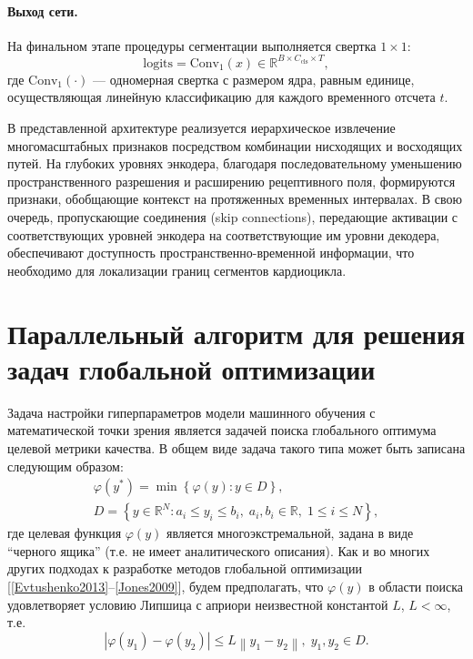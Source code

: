 \documentclass[10pt,a4paper]{book}
\begin{document}
\paragraph{Выход сети.}
На финальном этапе процедуры сегментации выполняется свертка $1\times1$:
\[
\text{logits} = \text{Conv}_{1}(x) \in \mathbb{R}^{B \times C_{\text{cls}} \times T},
\]
где $\text{Conv}_{1}(\cdot)$ --- одномерная свертка с размером ядра, равным единице, осуществляющая линейную классификацию для каждого временного отсчета $t$.

В представленной архитектуре реализуется иерархическое извлечение многомасштабных признаков посредством комбинации нисходящих и восходящих путей. На глубоких уровнях энкодера, благодаря последовательному уменьшению пространственного разрешения и расширению рецептивного поля, формируются признаки, обобщающие контекст на протяженных временных интервалах. В свою очередь, пропускающие соединения (skip connections), передающие активации с соответствующих уровней энкодера на соответствующие им уровни декодера, обеспечивают доступность пространственно-временной информации, что необходимо для локализации границ сегментов кардиоцикла.


\section{Параллельный алгоритм для решения задач глобальной оптимизации}
\label{sec-PGSA}

Задача настройки гиперпараметров модели машинного обучения с математической точки зрения является задачей поиска глобального оптимума целевой метрики качества. В общем виде задача такого типа может быть записана следующим образом:
\begin{gather}
\varphi(y^\ast)=\min{\left\{\varphi(y):y\in D\right\}}, \label{eq_opt_problem}\\
D=\left\{y\in \mathbb{R}^N: a_i\leqslant y_i \leqslant b_i, \; a_i,b_i\in \mathbb{R}, \;  1\leqslant i \leqslant N\right\}, \label{eq_D}
\end{gather}
где целевая функция $\varphi(y)$ является многоэкстремальной, задана в виде ``черного ящика'' (т.е. не имеет аналитического описания). Как и во многих других подходах к разработке методов глобальной оптимизации [\ref{Evtushenko2013}--\ref{Jones2009}], будем предполагать, что $\varphi(y)$ в области поиска удовлетворяет условию Липшица с априори неизвестной константой $L$, $L<\infty$, т.е.
\[
\left|\varphi(y_1)-\varphi(y_2)\right|\leqslant L\left\|y_1-y_2\right\|,\; y_1,y_2 \in D.
\]
\end{document}
